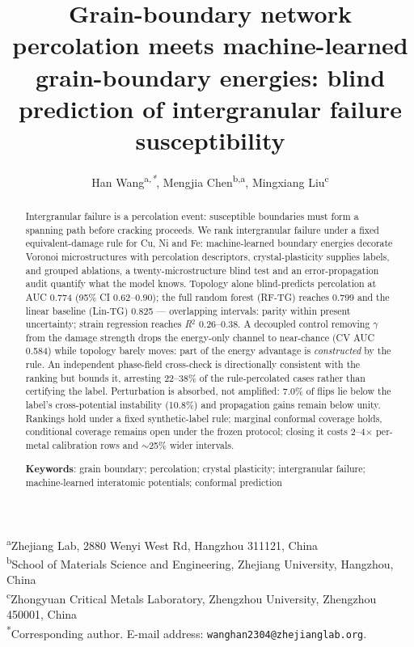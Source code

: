 \documentclass[12pt]{article}
\title{Grain-boundary network percolation meets machine-learned grain-boundary energies: blind prediction of intergranular failure susceptibility}
\author{Han Wang\textsuperscript{a,\textit{*}}, Mengjia Chen\textsuperscript{b,a}, Mingxiang Liu\textsuperscript{c}}
\date{}
\begin{document}
\maketitle

{\noindent\small
\textsuperscript{a}Zhejiang Lab, 2880 Wenyi West Rd, Hangzhou 311121, China\\
\textsuperscript{b}School of Materials Science and Engineering, Zhejiang University, Hangzhou, China\\
\textsuperscript{c}Zhongyuan Critical Metals Laboratory, Zhengzhou University, Zhengzhou 450001, China\\
\textsuperscript{*}Corresponding author. E-mail address: \texttt{wanghan2304@zhejianglab.org}.}

\vspace{0.6em}

\begin{abstract}
Intergranular failure is a percolation event: susceptible boundaries must form a spanning path before cracking proceeds. We rank intergranular failure under a fixed equivalent-damage rule for Cu, Ni and Fe: machine-learned boundary energies decorate Voronoi microstructures with percolation descriptors, crystal-plasticity supplies labels, and grouped ablations, a twenty-microstructure blind test and an error-propagation audit quantify what the model knows. Topology alone blind-predicts percolation at AUC 0.774 (95\% CI 0.62--0.90); the full random forest (RF-TG) reaches 0.799 and the linear baseline (Lin-TG) 0.825 --- overlapping intervals: parity within present uncertainty; strain regression reaches \textit{R}$^{2}$ 0.26--0.38. A decoupled control removing $\gamma$ from the damage strength drops the energy-only channel to near-chance (CV AUC 0.584) while topology barely moves: part of the energy advantage is \textit{constructed} by the rule. An independent phase-field cross-check is directionally consistent with the ranking but bounds it, arresting 22--38\% of the rule-percolated cases rather than certifying the label. Perturbation is absorbed, not amplified: 7.0\% of flips lie below the label's cross-potential instability (10.8\%) and propagation gains remain below unity. Rankings hold under a fixed synthetic-label rule; marginal conformal coverage holds, conditional coverage remains open under the frozen protocol; closing it costs 2--4$\times$ per-metal calibration rows and $\sim$25\% wider intervals.

\vspace{0.6em}
\noindent\textbf{Keywords}: grain boundary; percolation; crystal plasticity; intergranular failure; machine-learned interatomic potentials; conformal prediction
\end{abstract}
\end{document}
